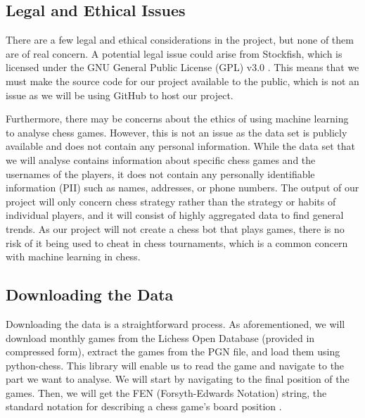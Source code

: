 \documentclass[%
 superscriptaddress,
showpacs,preprintnumbers,
 amsmath,
 amssymb,
 aps,
 pra,
showkeys,
onecolumn,
notitlepage,
11pt,
tightenlines      %
]{revtex4-1}
\begin{document}
\subsection{Legal and Ethical Issues}
There are a few legal and ethical considerations in the project, but none of them are of real concern. A potential legal issue could arise from Stockfish, which is licensed under the GNU General Public License (GPL) v3.0 \cite{stockfishRepository}. This means that we must make the source code for our project available to the public, which is not an issue as we will be using GitHub to host our project.

Furthermore, there may be concerns about the ethics of using machine learning to analyse chess games. However, this is not an issue as the data set is publicly available and does not contain any personal information. While the data set that we will analyse contains information about specific chess games and the usernames of the players, it does not contain any personally identifiable information (PII) such as names, addresses, or phone numbers. The output of our project will only concern chess strategy rather than the strategy or habits of individual players, and it will consist of highly aggregated data to find general trends. As our project will not create a chess bot that plays games, there is no risk of it being used to cheat in chess tournaments, which is a common concern with machine learning in chess.

\subsection{Downloading the Data}
Downloading the data is a straightforward process. As aforementioned, we will download monthly games from the Lichess Open Database (provided in compressed form), extract the games from the PGN file, and load them using python-chess. This library will enable us to read the game and navigate to the part we want to analyse. We will start by navigating to the final position of the games. Then, we will get the FEN (Forsyth-Edwards Notation) string, the standard notation for describing a chess game's board position \cite{pgnSpecification}. 
\end{document}
